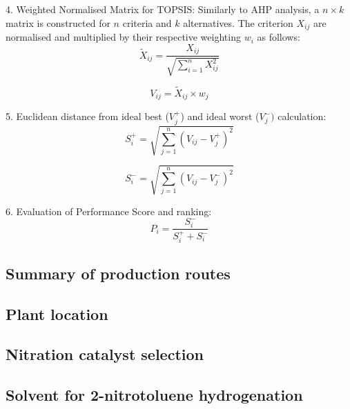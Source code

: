 4. Weighted Normalised Matrix for TOPSIS:
Similarly to AHP analysis, a $n\times k$ matrix is constructed for $n$ criteria and $k$ alternatives. The criterion $X_{ij}$ are normalised and multiplied by their respective weighting $w_i$ as follows:
\begin{equation}
    \tilde{X}_{ij}=\frac{X_{ij}}{\sqrt{\sum^{n}_{i=1}X_{ij}^{2}}}
\end{equation}

\begin{equation}
    V_{ij}=\tilde{X}_{ij}\times w_j
\end{equation}

5. Euclidean distance from ideal best ($V_{j}^{+}$) and ideal worst ($V_{j}^{-})$ calculation:
\begin{equation}
    S_{i}^{+}=\sqrt{\sum_{j=1}^{n}(V_{ij}-V_{j}^{+})^2}
\end{equation}

\begin{equation}
    S_{i}^{-}=\sqrt{\sum_{j=1}^{n}(V_{ij}-V_{j}^{-})^2}
\end{equation}

6. Evaluation of Performance Score and ranking:
\begin{equation}
    P_{i}=\frac{S_{i}^{-}}{S_{i}^{+}+S_{i}^{-}}
\end{equation}
\subsection{Summary of production routes}

\subsection{Plant location}

\subsection{Nitration catalyst selection}

\subsection{Solvent for 2-nitrotoluene hydrogenation}

